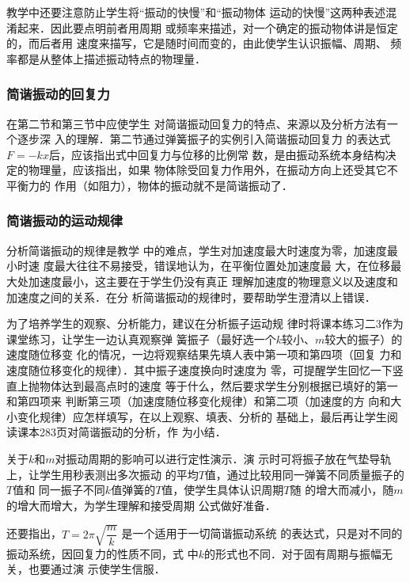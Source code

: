 教学中还要注意防止学生将“振动的快慢”和“振动物体
运动的快慢”这两种表述混淆起来．因此要点明前者用周期
或频率来描述，对一个确定的振动物体讲是恒定的，而后者用
速度来描写，它是随时间而变的，由此使学生认识振幅、周期、
频率都是从整体上描述振动特点的物理量．

\subsubsection{简谐振动的回复力}

在第二节和第三节中应使学生
对简谐振动回复力的特点、来源以及分析方法有一个逐步深
入的理解．第二节通过弹簧振子的实例引入简谐振动回复力
的表达式$F=-kx$后，应该指出式中回复力与位移的比例常
数，是由振动系统本身结构决定的物理量，应该指出，如果
物体除受回复力作用外，在振动方向上还受其它不平衡力的
作用（如阻力），物体的振动就不是简谐振动了．

\subsubsection{简谐振动的运动规律}

分析简谐振动的规律是教学
中的难点，学生对加速度最大时速度为零，加速度最小时速
度最大往往不易接受，错误地认为，在平衡位置处加速度最
大，在位移最大处加速度最小，这主要在于学生仍没有真正
理解加速度的物理意义以及速度和加速度之间的关系．在分
析简谐振动的规律时，要帮助学生澄清以上错误．

为了培养学生的观察、分析能力，建议在分析振子运动规
律时将课本练习二3作为课堂练习，让学生一边认真观察弹
簧振子（最好选一个$k$较小、$m$较大的振子）的速度随位移变
化的情况，一边将观察结果先填人表中第一项和第四项（回复
力和速度随位移变化的规律）．其中振子速度换向时速度为
零，可提醒学生回忆一下竖直上抛物体达到最高点时的速度
等于什么，然后要求学生分别根据已填好的第一和第四项来
判断第三项（加速度随位移变化规律）和第二项（加速度的方
向和大小变化规律）应怎样填写，在以上观察、填表、分析的
基础上，最后再让学生阅读课本283页对简谐振动的分析，作
为小结．

关于$k$和$m$对振动周期的影响可以进行定性演示．演
示时可将振子放在气垫导轨上，让学生用秒表测出多次振动
的平均$T$值，通过比较用同一弹簧不同质量振子的$T$值和
同一振子不同$k$值弹簧的$T$值，使学生具体认识周期$T$随
的增大而减小，随$m$的增大而增大，为学生理解和接受周期
公式做好准备．


还要指出，$T=2\pi\sqrt{\dfrac{m}{k}}$
是一个适用于一切简谐振动系统
的表达式，只是对不同的振动系统，因回复力的性质不同，式
中$k$的形式也不同．对于固有周期与振幅无关，也要通过演
示使学生信服．

